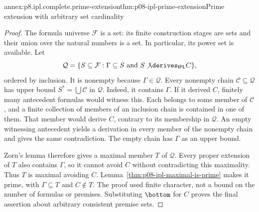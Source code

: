 \begin{annexitem}{annex:p8.ipl.complete.prime-extension}{thm:p08-ipl-prime-extension}{Prime extension with arbitrary set cardinality}
\begin{proof}
The formula universe \(\mathcal F\) is a set: its finite construction
stages are sets and their union over the natural numbers is a set.
In particular, its power set is available. Let
\[
 \mathcal Q=\{S\subseteq\mathcal F:\Gamma\subseteq S
          \text{ and }S\not\derives_{\mathsf{IPL}}C\},
\]
ordered by inclusion. It is nonempty because \(\Gamma\in\mathcal Q\).
Every nonempty chain \(\mathcal C\subseteq\mathcal Q\) has upper
bound \(S^*=\bigcup\mathcal C\) in \(\mathcal Q\).
Indeed, it contains \(\Gamma\). If it derived \(C\), finitely
many antecedent formulas would witness this. Each belongs to some member
of \(\mathcal C\), and a finite collection of members of an inclusion
chain is contained in one of them. That member would derive \(C\),
contrary to its membership in \(\mathcal Q\). An empty witnessing
antecedent yields a derivation in every member of the nonempty chain
and gives the same contradiction. The empty chain has \(\Gamma\) as
an upper bound.

Zorn's lemma therefore gives a maximal member \(T\) of \(\mathcal Q\).
Every proper extension of \(T\) also contains \(\Gamma\), so it
cannot avoid \(C\) without contradicting this maximality. Thus \(T\)
is maximal avoiding \(C\). Lemma~\ref{thm:p08-ipl-maximal-is-prime}
makes it prime, with \(\Gamma\subseteq T\) and \(C\notin T\).
The proof used finite character, not a bound on the number of formulas
or premises. Substituting \(\bottom\) for \(C\) proves the final
assertion about arbitrary consistent premise sets.
\end{proof}
\end{annexitem}

